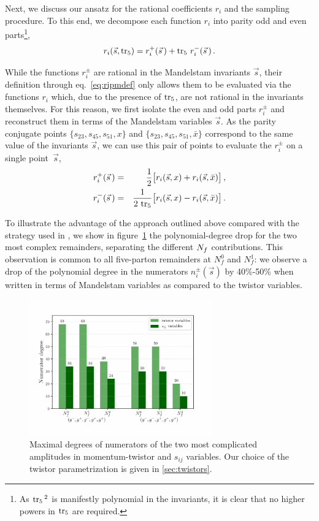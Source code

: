 Next, we discuss our ansatz for the rational coefficients $r_i$ and the sampling procedure.
To this end, we decompose each function $r_i$ into parity odd and even parts\footnote{
  As $\operatorname{tr_5}{}^2$ is manifestly polynomial in the invariants, it is clear that
  no higher powers in $\operatorname{tr_5}$ are required. 
},
\begin{equation}
    \label{eq:ripmdef}
		 r_i(\vec s, \operatorname{tr_5} ) = r_i^+(\vec s\,)  + \operatorname{tr_5} \, r_i^-(\vec s\,)\,. 
\end{equation}
%

While the functions $r_i^{\pm}$  are rational in the Mandelstam 
invariants $\vec s$, their
definition through eq.~\eqref{eq:ripmdef} only allows them to be
evaluated via the functions $r_i$ which, due to the presence of
$\operatorname{tr_5}$, are not rational in the invariants themselves. 
For this reason, we first isolate the even and odd parts $r_i^\pm$
and reconstruct them in terms of the Mandelstam variables $\vec s$.
As the parity conjugate points $\{s_{23},s_{45},s_{51}, x\}$
and $\{s_{23},s_{45},s_{51}, \bar x\}$ 
correspond to  the same  value of the invariants $\vec s$, we can use
this pair of points to evaluate the $r_i^{\pm}$ on a single point~$\vec s$,
\begin{eqnarray}
		r^+_i(\vec s\, ) &=& \frac{1}{2} \big[ r_i(\vec s, x ) + r_i(\vec s,\bar x ) \big]\,,\\
		r^-_i(\vec s\, ) &=& \frac{1}{2\, \operatorname{tr_5} } \big[ r_i(\vec s,x ) - r_i(\vec s,\bar x ) \big]\,.
\end{eqnarray}



To illustrate the advantage of the approach outlined above compared with the
strategy used in \cite{Abreu:2018zmy}, we show in
figure~\ref{fig:degrees-twXsij}  the polynomial-degree drop for the
two most complex remainders, separating the different ${N_f}$ contributions.
This observation is common to all five-parton remainders at $N_f^0$ and $N_f^1$: 
we observe a drop of the polynomial degree in the numerators  $n_i^\pm(\vec s)$ by 
40\%-50\% when written in terms of Mandelstam variables as compared to the twistor 
variables.

\begin{figure}[ht]
  \centering
  \includegraphics[width = 0.7\textwidth]{plots/twistorXsijs_comparison.pdf}
  \caption{
    Maximal degrees of numerators of the two most complicated amplitudes in momentum-twistor and $s_{ij}$ variables.
    Our choice of the twistor parametrization is given in \cref{sec:twistors}.
  }
  \label{fig:degrees-twXsij}
\end{figure}



